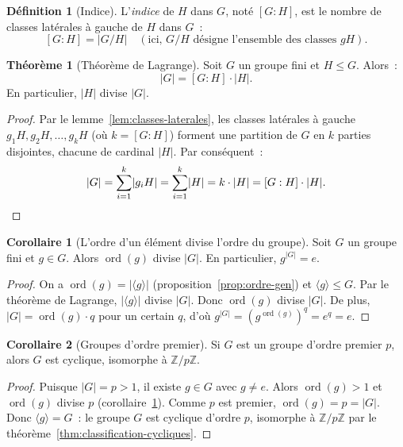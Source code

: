 \documentclass[12pt,a4paper,openany]{book}
\theoremstyle{definition}
\newtheorem{definition}{Définition}[chapter]
\newtheorem{theoreme}{Théorème}[chapter]
\newtheorem{corollaire}{Corollaire}[chapter]
\newcommand{\Z}{\mathbb{Z}}
\DeclareMathOperator{\ord}{ord}
\newcommand{\abs}[1]{\lvert #1 \rvert}
\newcommand{\gen}[1]{\langle #1 \rangle}
\newcommand{\idx}[2]{[#1:#2]}
\begin{document}
\begin{definition}[Indice]
\label{def:indice}
L'\emph{indice} de $H$ dans $G$, noté $\idx{G}{H}$, est le nombre de classes latérales
à gauche de $H$ dans $G$~:
\[
  \idx{G}{H} = \abs{G/H} \quad (\text{ici, $G/H$ désigne l'ensemble des classes $gH$}).
\]
\end{definition}

\begin{theoreme}[Théorème de Lagrange]
\label{thm:lagrange}
Soit $G$ un groupe fini et $H \leq G$. Alors~:
\[
  \abs{G} = \idx{G}{H} \cdot \abs{H}.
\]
En particulier, $\abs{H}$ divise $\abs{G}$.
\end{theoreme}

\begin{proof}
Par le lemme~\ref{lem:classes-laterales}, les classes latérales à gauche $g_1 H, g_2 H,
\ldots, g_k H$ (où $k = \idx{G}{H}$) forment une partition de $G$ en $k$ parties
disjointes, chacune de cardinal $\abs{H}$. Par conséquent~:
\[
  \abs{G} = \sum_{i=1}^{k} \abs{g_i H} = \sum_{i=1}^{k} \abs{H} = k \cdot \abs{H}
  = \idx{G}{H} \cdot \abs{H}. \qedhere
\]
\end{proof}

\begin{corollaire}[L'ordre d'un élément divise l'ordre du groupe]
\label{cor:ordre-divise}
Soit $G$ un groupe fini et $g \in G$. Alors $\ord(g)$ divise $\abs{G}$. En particulier,
$g^{\abs{G}} = e$.
\end{corollaire}

\begin{proof}
On a $\ord(g) = \abs{\gen{g}}$ (proposition~\ref{prop:ordre-gen}) et $\gen{g} \leq G$.
Par le théorème de Lagrange, $\abs{\gen{g}}$ divise $\abs{G}$. Donc $\ord(g)$ divise
$\abs{G}$. De plus, $\abs{G} = \ord(g) \cdot q$ pour un certain $q$, d'où $g^{\abs{G}}
= (g^{\ord(g)})^q = e^q = e$.
\end{proof}

\begin{corollaire}[Groupes d'ordre premier]
\label{cor:ordre-premier-cyclique}
Si $G$ est un groupe d'ordre premier $p$, alors $G$ est cyclique, isomorphe à
$\Z/p\Z$.
\end{corollaire}

\begin{proof}
Puisque $\abs{G} = p > 1$, il existe $g \in G$ avec $g \neq e$. Alors $\ord(g) > 1$ et
$\ord(g)$ divise $p$ (corollaire~\ref{cor:ordre-divise}). Comme $p$ est premier, $\ord(g)
= p = \abs{G}$. Donc $\gen{g} = G$~: le groupe $G$ est cyclique d'ordre $p$, isomorphe
à $\Z/p\Z$ par le théorème~\ref{thm:classification-cycliques}.
\end{proof}
\end{document}
